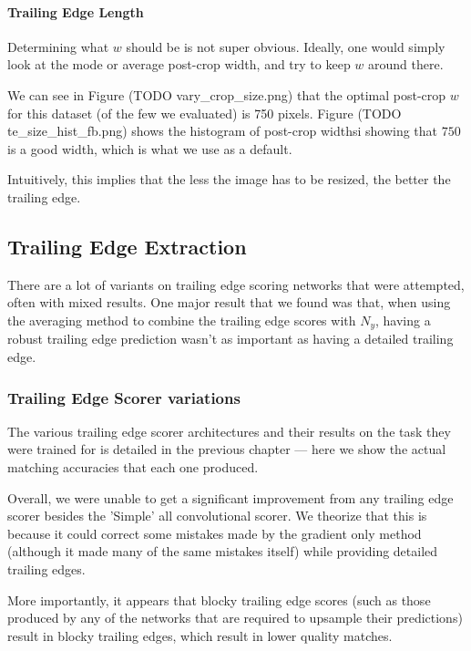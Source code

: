 \paragraph{Trailing Edge Length}

Determining what $w$ should be is not super obvious.
Ideally, one would simply look at the mode or average post-crop width, and try to keep $w$ around there.

We can see in Figure (TODO vary\_crop\_size.png) that the optimal post-crop $w$ for this dataset (of the few we evaluated) is 750 pixels.
Figure (TODO te\_size\_hist\_fb.png) shows the histogram of post-crop widthsi showing that $750$ is a good width, which is what we use as a default.

Intuitively, this implies that the less the image has to be resized, the better the trailing edge.

\subsection{Trailing Edge Extraction}

There are a lot of variants on trailing edge scoring networks that were attempted, often with mixed results. 
One major result that we found was that, when using the averaging method to combine the trailing edge scores with $N_y$, having a robust trailing edge prediction wasn't as important as having a detailed trailing edge.

\subsubsection{Trailing Edge Scorer variations}

The various trailing edge scorer architectures and their results on the task they were trained for is detailed in the previous chapter --- here we show the actual matching accuracies that each one produced.

Overall, we were unable to get a significant improvement from any trailing edge scorer besides the 'Simple' all convolutional scorer.
We theorize that this is because it could correct some mistakes made by the gradient only method (although it made many of the same mistakes itself) while providing detailed trailing edges.

More importantly, it appears that blocky trailing edge scores (such as those produced by any of the networks that are required to upsample their predictions) result in blocky trailing edges, which result in lower quality matches. 

